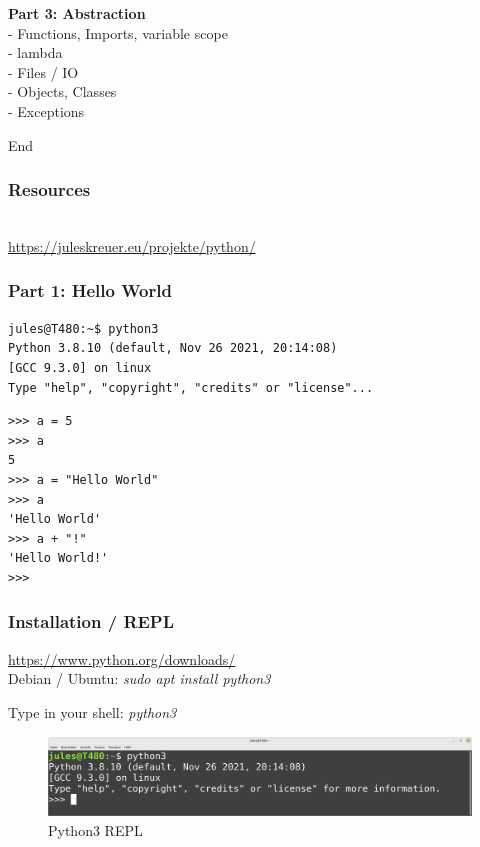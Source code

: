 \documentclass{beamer}
\begin{document}
\begin{frame}
	\begin{block}{}
		\textbf{Part 3: Abstraction}\\
		- Functions, Imports, variable scope\\
		- lambda\\
		- Files / IO\\
		- Objects, Classes\\
		- Exceptions\\
	\end{block}
	\begin{exampleblock}{}
	End
	\end{exampleblock}
\end{frame}
\begin{frame}[fragile]
	\frametitle{Resources}
	\center
	\\
	\center
	\url{https://juleskreuer.eu/projekte/python/}
\end{frame}

\begin{frame}[fragile]
	\frametitle{\textbf{Part 1:} Hello World}
	\begin{verbatim}
jules@T480:~$ python3
Python 3.8.10 (default, Nov 26 2021, 20:14:08) 
[GCC 9.3.0] on linux
Type "help", "copyright", "credits" or "license"...
	\end{verbatim}
\begin{verbatim}
>>> a = 5
>>> a
5
>>> a = "Hello World"
>>> a
'Hello World'
>>> a + "!"
'Hello World!'
>>> 
	\end{verbatim}
\end{frame}

\begin{frame}
	\frametitle{Installation / REPL}
	\begin{center}
		\url{https://www.python.org/downloads/}\\
		Debian / Ubuntu: \textit{sudo apt install python3}\\
	\end{center}
	\begin{center}
		Type in your shell: \textit{python3}
	\end{center}
\end{frame}

\begin{frame}
	\begin{figure}
		\includegraphics[width=12cm]{figures/console.png}
		\caption{Python3 REPL}
	\end{figure}
\end{frame}
\end{document}
